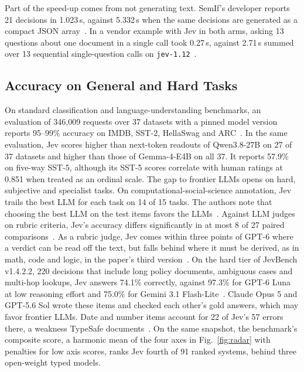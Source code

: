 Part of the speed-up comes from not generating text. SemIf's developer reports 21 decisions in 1.023\,s, against 5.332\,s when the same decisions are generated as a compact JSON array~\cite{lee2026semif}. In a vendor example with Jev in both arms, asking 13 questions about one document in a single call took 0.27\,s, against 2.71\,s summed over 13 sequential single-question calls on \texttt{jev-1.12}~\cite{typesafe2026docs}.

\subsection{Accuracy on General and Hard Tasks}

On standard classification and language-understanding benchmarks, an evaluation of 346{,}009 requests over 37 datasets with a pinned model version reports 95--99\% accuracy on IMDB, SST-2, HellaSwag and ARC~\cite{deusser2026evaluating}. In the same evaluation, Jev scores higher than next-token readouts of Qwen3.8-27B on 27 of 37 datasets and higher than those of Gemma-4-E4B on all 37. It reports 57.9\% on five-way SST-5, although its SST-5 scores correlate with human ratings at 0.851 when treated as an ordinal scale. The gap to frontier LLMs opens on hard, subjective and specialist tasks. On computational-social-science annotation, Jev trails the best LLM for each task on 14 of 15 tasks. The authors note that choosing the best LLM on the test items favors the LLMs~\cite{ibrahim2026evaluating}. Against LLM judges on rubric criteria, Jev's accuracy differs significantly in at most 8 of 27 paired comparisons~\cite{rao2026jev}. As a rubric judge, Jev comes within three points of GPT-6 where a verdict can be read off the text, but falls behind where it must be derived, as in math, code and logic, in the paper's third version~\cite{li2026jev}. On the hard tier of JevBench v1.4.2.2, 220 decisions that include long policy documents, ambiguous cases and multi-hop lookups, Jev answers 74.1\% correctly, against 97.3\% for GPT-6 Luna at low reasoning effort and 75.0\% for Gemini 3.1 Flash-Lite~\cite{jevbench2026v1422}. Claude Opus 5 and GPT-5.6 Sol wrote these items and checked each other's gold answers, which may favor frontier LLMs. Date and number items account for 22 of Jev's 57 errors there, a weakness TypeSafe documents~\cite{typesafe2026docs}. On the same snapshot, the benchmark's composite score, a harmonic mean of the four axes in Fig.~\ref{fig:radar} with penalties for low axis scores, ranks Jev fourth of 91 ranked systems, behind three open-weight typed models. 

